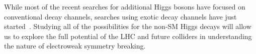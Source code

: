 While most of the recent searches for additional Higgs bosons have focused on conventional decay channels, searches using exotic decay channels have just started~\cite{Curtin:2013fra, Brownson:2013lka, Coleppa:2014hxa, Coleppa:2014cca,Li:2015lra,Dorsch:2014qja,Chen:2013emb,Chen:2014dma,Enberg:2014pua,CMS:2014yra,Aad:2015wra,CMS:2013eua}. Studying all of the possibilities for the non-SM Higgs decays will allow us to explore the full potential of the LHC and future colliders in understanding the nature of electroweak symmetry breaking. 
